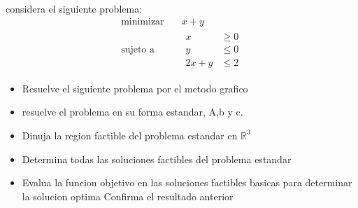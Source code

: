 \documentclass{article}
\begin{document}
considera el siguiente problema:
\begin{equation*}
  \begin{aligned}
      \text{minimizar} \quad & x+y \\
      \text{sujeto a } \quad &
      \begin{aligned}
        x & \geq 0 \\
        y & \leq 0 \\
        2x+y & \leq 2
      \end{aligned}
  \end{aligned}
\end{equation*}
\begin{itemize}
\item Resuelve el siguiente problema por el metodo grafico
\item resuelve el problema en su forma estandar, A,b y c.
\item Dinuja la region factible del problema estandar en $\mathbb{R}^3$
\item Determina todas las soluciones factibles del problema estandar
  \item Evalua la funcion objetivo en las soluciones factibles basicas para determinar la solucion optima Confirma el resultado anterior
  \end{itemize}
\end{document}
